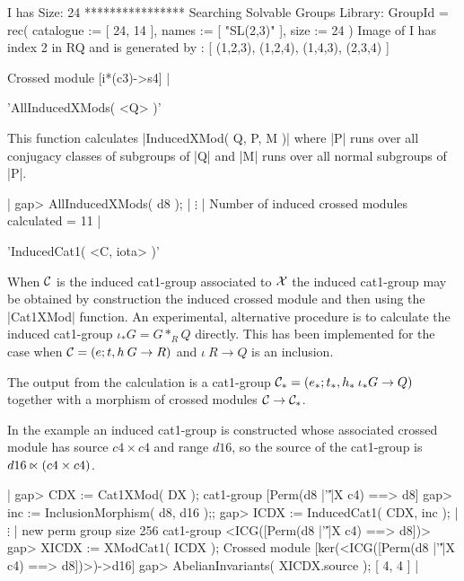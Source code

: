 {     I has Size: 24
    **************** 
     Searching Solvable Groups Library:
     GroupId = 
    rec(
      catalogue := [ 24, 14 ],
      names := [ "SL(2,3)" ],
      size := 24 )
    Image of I has index 2 in RQ and is generated by : 
    [ (1,2,3), (1,2,4), (1,4,3), (2,3,4) ]

    Crossed module [i*(c3)->s4]            |

%

'AllInducedXMods( <Q> )'

This function calculates |InducedXMod( Q, P, M )|  where |P| runs over
all conjugacy classes of subgroups of |Q| and |M| runs over all normal
subgroups of |P|.

|    gap> AllInducedXMods( d8 );
           | $\vdots$ |
    Number of induced crossed modules calculated = 11  |

%

'InducedCat1( <C, iota> )'

When  ${\cal C}$  is the induced cat1-group associated to ${\cal X}$
the induced cat1-group may be obtained by construction the induced
crossed module and then using the |Cat1XMod| function.
An experimental, alternative procedure is to calculate the
induced cat1-group   $\iota_\ast G = G \ast_R Q$  directly.  
This has been implemented for the case when ${\cal C} = ( e;t,h \: G \to R)$
and $\iota \: R \to Q$  is an inclusion.

The output from the calculation is a cat1-group
${\cal C}_\ast = (e_\ast;t_\ast, h_\ast \: \iota_{\ast}G \to Q)$
together with a morphism of crossed modules
${\cal C} \to {\cal C}_{\ast}$.

In the example an induced cat1-group is constructed whose associated
crossed module has source $c4 \times c4$ and range $d16$, so the 
source of the cat1-group is $d16 \semidirect (c4 \times c4)$.

|    gap> CDX := Cat1XMod( DX );
    cat1-group [Perm(d8 |'\|'|X c4) ==> d8] 
    gap> inc := InclusionMorphism( d8, d16 );;
    gap> ICDX := InducedCat1( CDX, inc );
          | $\vdots$ |
    new perm group size 256
    cat1-group <ICG([Perm(d8 |'\|'|X c4) ==> d8])> 
    gap> XICDX := XModCat1( ICDX );
    Crossed module [ker(<ICG([Perm(d8 |'\|'|X c4) ==> d8])>)->d16]
    gap> AbelianInvariants( XICDX.source );
    [ 4, 4 ]  |

\newpage

}
